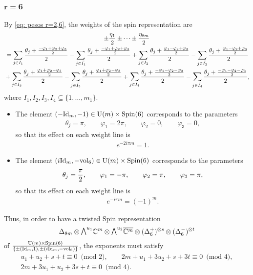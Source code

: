 \documentclass[10pt,a4paper]{amsart}
\newcommand{\ext}{\raise1pt\hbox{$\textstyle\bigwedge$}}
\numberwithin{equation}{section}
\begin{document}
\subsubsection[$r=6$]{$\boldsymbol{r=6}$}

By \eqref{eq: pesos r=2,6}, the weights of the spin representation are
\begin{gather*}
 \pm {\eta_1\over 2} \pm \cdots \pm {\eta_{8m}\over 2}\\
 {} = \sum_{j\in I_1} {\theta_{j}+{-\varphi_1+\varphi_2+\varphi_3\over 2}\over 2} - \sum_{j\in \bar{I_1}} {\theta_{j}+{-\varphi_1+\varphi_2+\varphi_3\over 2}\over 2}
 + \sum_{j\in I_2} {\theta_{j}+{\varphi_1-\varphi_2+\varphi_3\over 2}\over 2} - \sum_{j\in \bar{I_2}} {\theta_{j}+{\varphi_1-\varphi_2+\varphi_3\over 2}\over 2} \\
{} + \sum_{j\in I_3} {\theta_{j}+{\varphi_1+\varphi_2-\varphi_3\over 2}\over 2} - \sum_{j\in \bar{I_3}} {\theta_{j}+{\varphi_1+\varphi_2-\varphi_3\over 2}\over 2}
 + \sum_{j\in I_4} {\theta_{j}+{-\varphi_1-\varphi_2-\varphi_3\over 2}\over 2} - \sum_{j\in \bar{I_4}} {\theta_{j}+{-\varphi_1-\varphi_2-\varphi_3\over 2}\over 2} ,
\end{gather*}
where $I_1,I_2, I_3,I_4\subseteq \{1,\dots,m_1\}$.

\begin{itemize}\itemsep=0pt
\item The element $(-{\rm Id}_{m},-1)\in {\rm U}(m)\times {\rm Spin}(6)$ corresponds to the parameters
\begin{gather*}
 \theta_{j} = \pi , \qquad \varphi_1 = 2\pi,\qquad \varphi_2 = 0,\qquad \varphi_3 = 0,
\end{gather*}
so that its ef\/fect on each weight line is
\begin{gather*}e^{-2i\pi m} = 1.
\end{gather*}

\item The element $(i{\rm Id}_m,-{\rm vol}_6)\in {\rm U}(m)\times {\rm Spin}(6)$ corresponds to the parameters
\begin{gather*}
 \theta_{j} = {\pi\over 2} , \qquad \varphi_1 = -\pi,\qquad \varphi_2 = \pi, \qquad \varphi_3 = \pi,
\end{gather*}
so that its ef\/fect on each weight line is
\begin{gather*}e^{-i\pi m} = (-1)^{m}.
\end{gather*}

\end{itemize}
Thus, in order to have a twisted Spin representation
\begin{gather*}\Delta_{8m}\otimes \ext^{u_1} \mathbb{C}^{m}\otimes \ext^{u_2} \overline{\mathbb{C}^{m}}\otimes (\Delta_6^+)^{\otimes s}\otimes (\Delta_6^-)^{\otimes t}\end{gather*}
of ${{\rm U}(m) \times {\rm Spin}(6)\over \{\pm ({\rm Id}_{m},1),\pm (i{\rm Id}_{m},-{\rm vol}_6)\}}$, the exponents must satisfy
\begin{gather*}
 u_1+u_2+s+t \equiv 0 \,\,\,\mbox{(mod 2)},\qquad
 2m+u_1+3u_2+s+3t \equiv 0 \,\,\,\mbox{(mod 4)},\\
 2m+3u_1+u_2+3s+t \equiv 0 \,\,\,\mbox{(mod 4)}.
\end{gather*}
\end{document}
